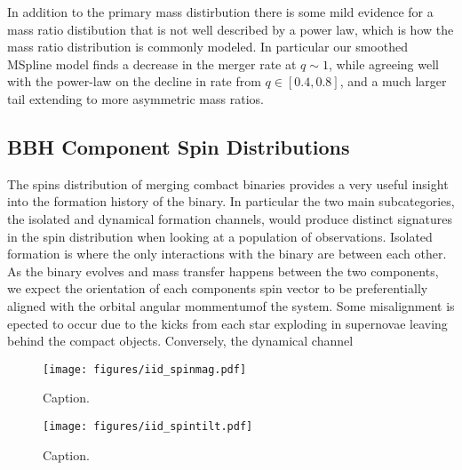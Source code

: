 In addition to the primary mass distirbution there is some mild evidence for a mass ratio distibution that is not well described by a power law, 
which is how the mass ratio distribution is commonly modeled. In particular our smoothed MSpline model finds a decrease in the merger rate at $q\sim1$, 
while agreeing well with the power-law on the decline in rate from $q \in [0.4, 0.8]$, and a much larger tail extending to more asymmetric
mass ratios. 

\subsection{BBH Component Spin Distributions} \label{sec:spin_dist}

The spins distribution of merging combact binaries provides a very useful insight into the formation history of the binary. In particular the two main subcategories, 
the isolated and dynamical formation channels, would produce distinct signatures in the spin distribution when looking at a population of observations. Isolated formation
is where the only interactions with the binary are between each other. As the binary evolves and mass transfer happens between the two components, we expect the orientation
of each components spin vector to be preferentially aligned with the orbital angular mommentumof the system. Some misalignment is epected to occur due to the kicks from 
each star exploding in supernovae leaving behind the compact objects. Conversely, the dynamical channel     
\begin{figure}
    \texttt{[image: figures/iid\_spinmag.pdf]}
    \caption{Caption.}
    \label{fig:iid_spinmag_dist}
\end{figure}

\begin{figure}
    \texttt{[image: figures/iid\_spintilt.pdf]}
    \caption{Caption.}
    \label{fig:iid_spintilt_dist}
\end{figure}

